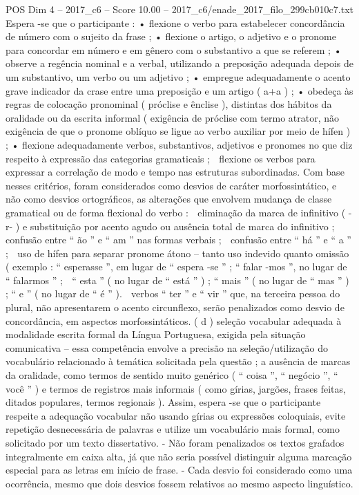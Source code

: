 \begin{textsample}{POS Dim 4 – 2017\_c6 – Score 10.00 – 2017\_c6/enade\_2017\_filo\_299cb010c7.txt}
Espera -se que o participante : • flexione o verbo para estabelecer concordância de número com o sujeito da frase ; • flexione o artigo, o adjetivo e o pronome para concordar em número e em gênero com o substantivo a que se referem ; • observe a regência nominal e a verbal, utilizando a preposição adequada depois de um substantivo, um verbo ou um adjetivo ; • empregue adequadamente o acento grave indicador da crase entre uma preposição e um artigo ( a+a ) ; • obedeça às regras de colocação pronominal ( próclise e ênclise ), distintas dos hábitos da oralidade ou da escrita informal ( exigência de próclise com termo atrator, não exigência de que o pronome oblíquo se ligue ao verbo auxiliar por meio de hífen ) ; • flexione adequadamente verbos, substantivos, adjetivos e pronomes no que diz respeito à expressão das categorias gramaticais ;  flexione os verbos para expressar a correlação de modo e tempo nas estruturas subordinadas.
Com base nesses critérios, foram considerados como desvios de caráter morfossintático, e não como desvios ortográficos, as alterações que envolvem mudança de classe gramatical ou de forma flexional do verbo :  eliminação da marca de infinitivo ( -r- ) e substituição por acento agudo ou ausência total de marca do infinitivo ;  confusão entre “ ão ” e “ am ” nas formas verbais ;  confusão entre “ há ” e “ a ” ;  uso de hífen para separar pronome átono – tanto uso indevido quanto omissão ( exemplo : “ esperasse ”, em lugar de “ espera -se ” ; “ falar -mos ”, no lugar de “ falarmos ” ;  “ esta ” ( no lugar de “ está ” ) ; “ mais ” ( no lugar de “ mas ” ) ; “ e ” ( no lugar de “ é ” ).  verbos “ ter ” e “ vir ” que, na terceira pessoa do plural, não apresentarem o acento circunflexo, serão penalizados como desvio de concordância, em aspectos morfossintáticos. ( d ) seleção vocabular adequada à modalidade escrita formal da Língua Portuguesa, exigida pela situação comunicativa – essa competência envolve a precisão na seleção/utilização do vocabulário relacionado à temática solicitada pela questão ; a ausência de marcas da oralidade, como termos de sentido muito genérico ( “ coisa ”, “ negócio ”, “ você ” ) e termos de registros mais informais ( como gírias, jargões, frases feitas, ditados populares, termos regionais ).
Assim, espera -se que o participante respeite a adequação vocabular não usando gírias ou expressões coloquiais, evite repetição desnecessária de palavras e utilize um vocabulário mais formal, como solicitado por um texto dissertativo. - Não foram penalizados os textos grafados integralmente em caixa alta, já que não seria possível distinguir alguma marcação especial para as letras em início de frase. - Cada desvio foi considerado como uma ocorrência, mesmo que dois desvios fossem relativos ao mesmo aspecto linguístico.

\end{textsample}
